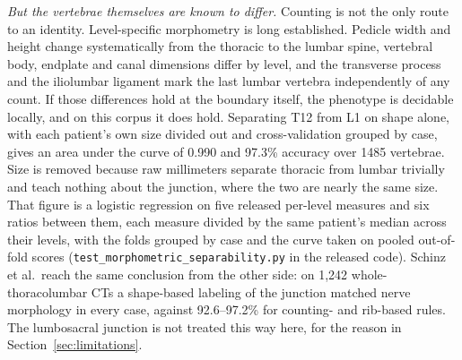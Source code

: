 \documentclass[aapm,mph,amsmath,amssymb,reprint]{revtex4-2}
\begin{document}
\emph{But the vertebrae themselves are known to differ.} Counting is not the only route to
an identity. Level-specific morphometry is long established. Pedicle width and height change
systematically from the thoracic to the lumbar spine,\cite{zindrick1987} vertebral body,
endplate and canal dimensions differ by level,\cite{panjabi1991,panjabi1992,benzel2015} and
the transverse process and the iliolumbar ligament mark the last lumbar vertebra
independently of any count.\cite{hughes2006,koninwalz2010} If those differences hold at the boundary itself, the phenotype is decidable locally, and on this corpus it does hold. Separating T12 from L1 on shape alone, with each patient's own size divided out and
cross-validation grouped by case, gives an area under the curve of 0.990 and 97.3\%
accuracy over 1485 vertebrae. Size is removed because raw millimeters separate thoracic
from lumbar trivially and teach nothing about the junction, where the two are nearly the
same size. That figure is a logistic regression on five released per-level measures and six
ratios between them, each measure divided by the same patient's median across their
levels, with the folds grouped by case and the curve taken on pooled out-of-fold scores
(\texttt{test\_morphometric\_separability.py} in the released code). Schinz et al.\ reach
the same conclusion from the other side: on 1{,}242 whole-thoracolumbar CTs a shape-based
labeling of the junction matched nerve morphology in every case, against 92.6--97.2\% for
counting- and rib-based rules.\cite{schinz2026} The lumbosacral junction is not treated
this way here, for the reason in Section~\ref{sec:limitations}.



\end{document}
